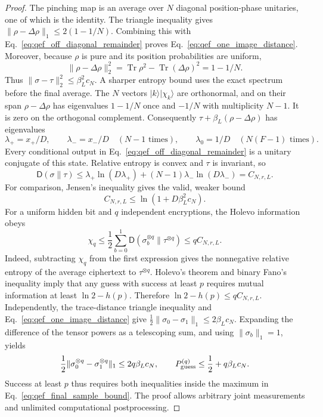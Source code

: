{\begin{proof}
The pinching map is an average over $N$ diagonal position-phase
unitaries, one of which is the identity. The triangle inequality gives
$\|\rho-\Delta\rho\|_1\leq2(1-1/N)$. Combining this with
Eq.~\eqref{eq:qef_off_diagonal_remainder} proves
Eq.~\eqref{eq:qef_one_image_distance}.
Moreover, because $\rho$ is pure and its position probabilities are
uniform,
\begin{equation}
 \|\rho-\Delta\rho\|_2^2
 =\operatorname{Tr}\rho^2-\operatorname{Tr}(\Delta\rho)^2
 =1-1/N.
\end{equation}
Thus $\|\sigma-\tau\|_2^2\leq\beta_L^2c_N$. A sharper entropy bound
uses the exact spectrum before the final average. The $N$ vectors
$|k\rangle|\chi_k\rangle$ are orthonormal, and on their span
$\rho-\Delta\rho$ has eigenvalues $1-1/N$ once and $-1/N$ with
multiplicity $N-1$. It is zero on the orthogonal complement.
Consequently $\tau+\beta_L(\rho-\Delta\rho)$ has eigenvalues
\begin{equation}
 \lambda_+=x_+/D,\qquad
 \lambda_-=x_-/D\quad(N-1\text{ times}),\qquad
 \lambda_0=1/D\quad(N(F-1)\text{ times}).
\end{equation}
Every conditional output in
Eq.~\eqref{eq:qef_off_diagonal_remainder} is a unitary conjugate of
this state. Relative entropy is convex and $\tau$ is invariant, so
\begin{equation}
 \mathsf D(\sigma\|\tau)
 \leq\lambda_+\ln(D\lambda_+)
       +(N-1)\lambda_-\ln(D\lambda_-)
 =C_{N,r,L}.
\end{equation}
For comparison, Jensen's inequality gives the valid, weaker bound
\begin{equation}
 C_{N,r,L}\leq\ln(1+D\beta_L^2c_N).
\end{equation}
For a uniform hidden bit and $q$ independent encryptions, the Holevo
information obeys
\begin{equation}
 \chi_q\leq\frac12\sum_{b=0}^1
 \mathsf D(\sigma_b^{\otimes q}\|\tau^{\otimes q})
 \leq qC_{N,r,L}.
\end{equation}
Indeed, subtracting $\chi_q$ from the first expression gives the
nonnegative relative entropy of the average ciphertext to
$\tau^{\otimes q}$. Holevo's theorem and binary Fano's inequality
\cite{Watrous2018QEF} imply that any guess with success at least $p$
requires mutual information at least $\ln2-h(p)$. Therefore
$\ln2-h(p)\leq qC_{N,r,L}$. Independently, the trace-distance triangle
inequality and Eq.~\eqref{eq:qef_one_image_distance} give
$\frac12\|\sigma_0-\sigma_1\|_1\leq2\beta_Lc_N$.
Expanding the difference of the tensor powers as a telescoping sum,
and using $\|\sigma_b\|_1=1$, yields
\begin{equation}
 \frac12\|\sigma_0^{\otimes q}-\sigma_1^{\otimes q}\|_1
 \leq 2q\beta_Lc_N,\qquad
 P_{\rm guess}^{(q)}\leq\frac12+q\beta_Lc_N.
\end{equation}
Success at least $p$ thus requires both inequalities inside the maximum
in Eq.~\eqref{eq:qef_final_sample_bound}. The proof allows arbitrary
joint measurements and unlimited computational postprocessing.
\end{proof}

}
